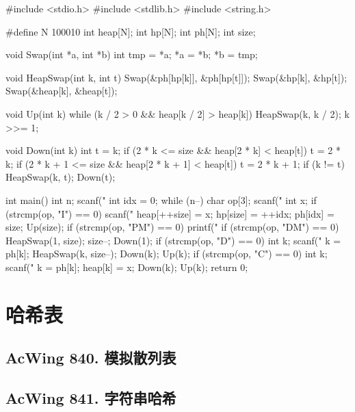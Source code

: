 \begin{mycpptwocol}[可修改任意元素的堆]
#include <stdio.h>
#include <stdlib.h>
#include <string.h>

#define N 100010
int heap[N];
int hp[N];
int ph[N];
int size;

void Swap(int *a, int *b)
{
    int tmp = *a;
    *a = *b;
    *b = tmp;
}

void HeapSwap(int k, int t)
{
    Swap(&ph[hp[k]], &ph[hp[t]]);
    Swap(&hp[k], &hp[t]);
    Swap(&heap[k], &heap[t]);
}

void Up(int k)
{
    while (k / 2 > 0 && heap[k / 2] > heap[k]) {
        HeapSwap(k, k / 2);
        k >>= 1;
    }
}

void Down(int k)
{
    int t = k;
    if (2 * k <= size && heap[2 * k] < heap[t]) {
        t = 2 * k;
    }
    if (2 * k + 1 <= size && heap[2 * k + 1] < heap[t]) {
        t = 2 * k + 1;
    }
    if (k != t) {
        HeapSwap(k, t);
        Down(t);
    }
}

int main()
{
    int n;
    scanf("%
    int idx = 0;
    while (n--) {
        char op[3];
        scanf("%
        int x;
        if (strcmp(op, "I") == 0) {
            scanf("%
            heap[++size] = x;
            hp[size] = ++idx;
            ph[idx] = size;
            Up(size);
        }
        if (strcmp(op, "PM") == 0) {
            printf("%
        }
        if (strcmp(op, "DM") == 0) {
            HeapSwap(1, size);
            size--;
            Down(1);
        }
        if (strcmp(op, "D") == 0) {
            int k;
            scanf("%
            k = ph[k];
            HeapSwap(k, size--);
            Down(k);
            Up(k);
        }
        if (strcmp(op, "C") == 0) {
            int k;
            scanf("%
            k = ph[k];
            heap[k] = x;
            Down(k);
            Up(k);
        }
    }
    return 0;
}
\end{mycpptwocol}

\section{哈希表}
\subsection{AcWing 840. 模拟散列表}
\subsection{AcWing 841. 字符串哈希}
